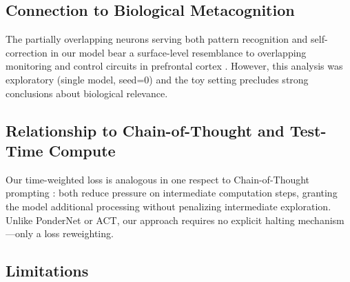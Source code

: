 \documentclass[10pt]{article}
\begin{document}
\subsection{Connection to Biological Metacognition}

The partially overlapping neurons serving both pattern recognition and self-correction in our model bear a surface-level resemblance to overlapping monitoring and control circuits in prefrontal cortex \citep{morales2018domain}. However, this analysis was exploratory (single model, seed=0) and the toy setting precludes strong conclusions about biological relevance.

\subsection{Relationship to Chain-of-Thought and Test-Time Compute}

Our time-weighted loss is analogous in one respect to Chain-of-Thought prompting \citep{wei2022chain}: both reduce pressure on intermediate computation steps, granting the model additional processing without penalizing intermediate exploration. Unlike PonderNet or ACT, our approach requires no explicit halting mechanism---only a loss reweighting.

\subsection{Limitations}
\end{document}

